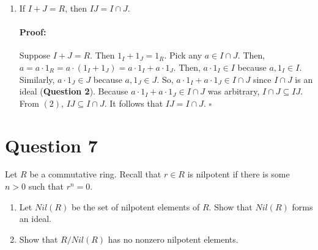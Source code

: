 \documentclass [12pt] {article}
\newenvironment{proof}{\paragraph{Proof:}}{\hfill$\square$}
\begin{document}
\begin{enumerate}
        \vspace{-1em}
        \begin{proof}
            Let $R$ be a ring, and $I, J \subseteq R$ be ideals. Then, from $(1)$, $IJ$ is an ideal
            in $R$. Suppose we have an arbitrary element $i_1 j_1 + \cdots + i_n j_n \in IJ$. Since 
            $I, J \subseteq R$ are ideals, $i_r j_s \in I$ and $i_r j_s \in J$. That is, 
            $i_r j_s \in I \cap J$. Since $I, J \subseteq R$ are ideals, they are both closed under
            addition. So, $i_1 j_1 + \cdots + i_n j_n \in I \cap J$. Since 
            $i_1 j_1 + \cdots + i_n j_n$ was arbitrary, $IJ \subseteq I \cap J$.
        \end{proof}
    \item If $I+J=R$, then $IJ=I\cap J$.
        \vspace{-1em}
        \begin{proof}
            Suppose $I + J = R$. Then $1_I + 1_J = 1_R$. Pick any $a \in I \cap J$. Then,
            $a = a \cdot 1_R = a \cdot (1_I + 1_J) = a \cdot 1_I + a \cdot 1_J$. Then, 
            $a \cdot 1_I \in I$ because $a, 1_I \in I$. Similarly, $a \cdot 1_J \in J$ 
            because $a, 1_J \in J$. So, $a \cdot 1_I + a \cdot 1_J \in I \cap J$ since $I \cap J$ 
            is an ideal (\textbf{Question 2}). Because $a \cdot 1_I + a \cdot 1_J \in I \cap J$ 
            was arbitrary, $I \cap J \subseteq IJ$. From $(2)$, $IJ \subseteq I \cap J$. It follows 
            that $IJ = I \cap J$.
        \end{proof}
\end{enumerate}
\newpage

\section*{Question 7}
Let $R$ be a commutative ring. Recall that $r\in R$ is nilpotent if there is some $n>0$ such that $r^n=0$. 

\begin{enumerate}
    \item Let $Nil(R)$ be the set of nilpotent elements of $R$. Show that $Nil(R)$ forms an ideal. 

    \item Show that $R/Nil(R)$ has no nonzero nilpotent elements.
\end{enumerate}
\end{document}
